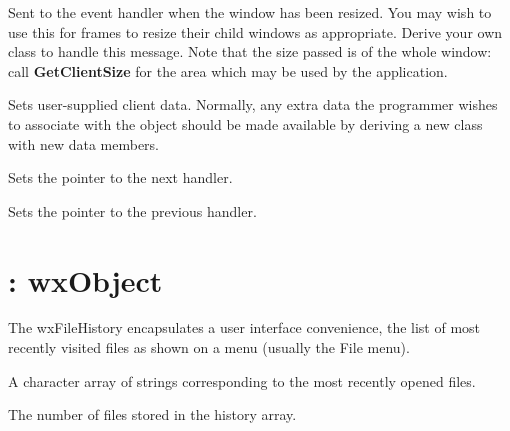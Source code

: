 
Sent to the event handler when the window has been resized. You may wish to use
this for frames to resize their child windows as appropriate. Derive
your own class to handle this message. Note that the size passed is of
the whole window: call {\bf GetClientSize} for the area which may be
used by the application.



Sets user-supplied client data.  Normally, any extra data the programmer wishes
to associate with the object should be made available by deriving a new class
with new data members.



Sets the pointer to the next handler.



Sets the pointer to the previous handler.



\section{: wxObject}\label{wxfilehistory}


The wxFileHistory encapsulates a user interface convenience, the
list of most recently visited files as shown on a menu (usually the File menu).



A character array of strings corresponding to the most recently opened
files.



The number of files stored in the history array.



